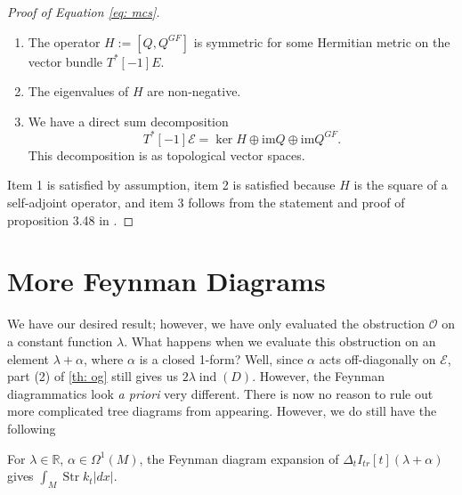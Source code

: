 \documentclass[11pt]{amsart}
\newcommand{\E}{\mscr{E}}
\newcommand{\mscr}{\mathscr}
\newcommand{\mbb}{\mathbb}
\newcommand{\R}{\mbb R}
\numberwithin{equation}{section}
\newcommand\ind{\operatorname{ind}}
\newcommand\Str{\operatorname{Str}}
\begin{document}
\begin{proof}[Proof of Equation \ref{eq: mcs}]
\begin{enumerate}
	\item The operator $H:= [Q,Q^{GF}]$ is symmetric for some Hermitian metric on the vector bundle $T^*[-1]E$.
	\item The eigenvalues of $H$ are non-negative.
	\item We have a direct sum decomposition 
	\[
	T^*[-1]\E = \ker H \oplus \text{im} Q \oplus \text{im} Q^{GF}.
	\]
	This decomposition is as topological vector spaces.
\end{enumerate}
Item 1 is satisfied by assumption, item 2 is satisfied because $H$ is the square of a self-adjoint operator, and item 3 follows from the statement and proof of proposition 3.48 in \cite{ref: bgv}.
\end{proof}
\section{More Feynman Diagrams}
We have our desired result; however, we have only evaluated the obstruction $\mathcal O$ on a constant function $\lambda$. What happens when we evaluate this obstruction on an element $\lambda+\alpha$, where $\alpha$ is a closed 1-form? Well, since $\alpha$ acts off-diagonally on $\E$, part (2) of \ref{th: og} still gives us $2\lambda\ind(D)$. However, the Feynman diagrammatics look \textit{a priori} very different. There is now no reason to rule out more complicated tree diagrams from appearing. However, we do still have the following 

\begin{proposition}
For $\lambda\in \R$, $\alpha \in \Omega^1(M)$, the Feynman diagram expansion of $\Delta_tI_{tr}[t](\lambda +\alpha)$ gives $\int_M \Str k_t |dx|$.
\end{proposition}
\end{document}
